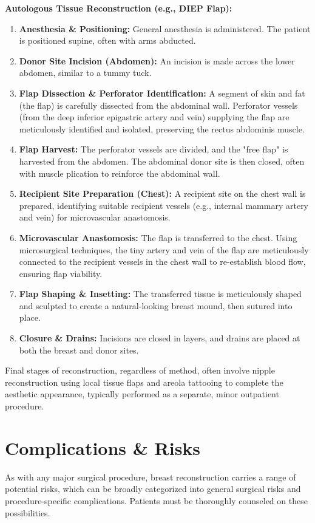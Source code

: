 \textbf{Autologous Tissue Reconstruction (e.g., DIEP Flap):}
\begin{enumerate}
  \item \textbf{Anesthesia \& Positioning:} General anesthesia is administered. The patient is positioned supine, often with arms abducted.
  \item \textbf{Donor Site Incision (Abdomen):} An incision is made across the lower abdomen, similar to a tummy tuck.
  \item \textbf{Flap Dissection \& Perforator Identification:} A segment of skin and fat (the flap) is carefully dissected from the abdominal wall. Perforator vessels (from the deep inferior epigastric artery and vein) supplying the flap are meticulously identified and isolated, preserving the rectus abdominis muscle.
  \item \textbf{Flap Harvest:} The perforator vessels are divided, and the "free flap" is harvested from the abdomen. The abdominal donor site is then closed, often with muscle plication to reinforce the abdominal wall.
  \item \textbf{Recipient Site Preparation (Chest):} A recipient site on the chest wall is prepared, identifying suitable recipient vessels (e.g., internal mammary artery and vein) for microvascular anastomosis.
  \item \textbf{Microvascular Anastomosis:} The flap is transferred to the chest. Using microsurgical techniques, the tiny artery and vein of the flap are meticulously connected to the recipient vessels in the chest wall to re-establish blood flow, ensuring flap viability.
  \item \textbf{Flap Shaping \& Insetting:} The transferred tissue is meticulously shaped and sculpted to create a natural-looking breast mound, then sutured into place.
  \item \textbf{Closure \& Drains:} Incisions are closed in layers, and drains are placed at both the breast and donor sites.
\end{enumerate}

Final stages of reconstruction, regardless of method, often involve nipple reconstruction using local tissue flaps and areola tattooing to complete the aesthetic appearance, typically performed as a separate, minor outpatient procedure.

\section*{Complications \& Risks}
As with any major surgical procedure, breast reconstruction carries a range of potential risks, which can be broadly categorized into general surgical risks and procedure-specific complications. Patients must be thoroughly counseled on these possibilities.

